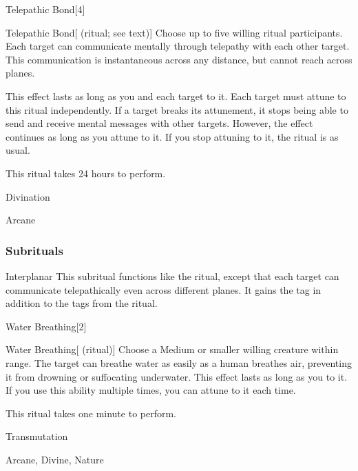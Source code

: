 \begin{spellsection}{Telepathic Bond}[4]


\begin{ability}{Telepathic Bond}[ (ritual; see text)]
Choose up to five willing ritual participants.
Each target can communicate mentally through telepathy with each other target.
This communication is instantaneous across any distance, but cannot reach across planes.

This effect lasts as long as you and each target  to it.
Each target must attune to this ritual independently.
If a target breaks its attunement, it stops being able to send and receive mental messages with other targets.
However, the effect continues as long as you attune to it.
If you stop attuning to it, the ritual is  as usual.

This ritual takes 24 hours to perform.
\end{ability}




 Divination

 Arcane
\end{spellsection}


\subsubsection{Subrituals}


\begin{ability}[\nth{8}]{Interplanar}
This subritual functions like the  ritual, except that each target can communicate telepathically even across different planes.
It gains the  tag in addition to the tags from the  ritual.
\end{ability}
\vspace{0.25em}


\begin{spellsection}{Water Breathing}[2]


\begin{ability}{Water Breathing}[ (ritual)]
Choose a Medium or smaller willing creature within \rngclose range.
The target can breathe water as easily as a human breathes air, preventing it from drowning or suffocating underwater.
This effect lasts as long as you  to it.
If you use this ability multiple times, you can attune to it each time.

This ritual takes one minute to perform.
\end{ability}




 Transmutation

 Arcane, Divine, Nature
\end{spellsection}
